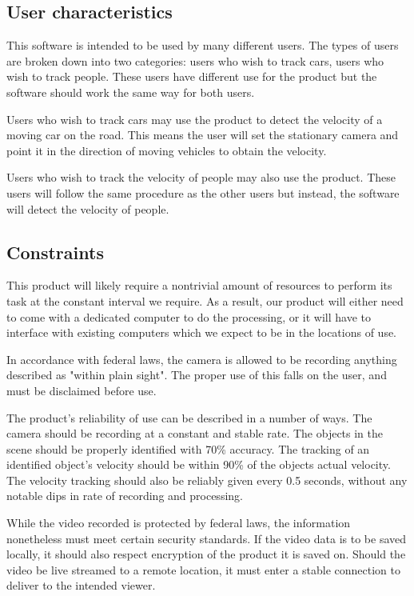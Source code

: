 \documentclass[letterpaper,10pt,onecolumn,draftclsnofoot]{IEEEtran}
\begin{document}
\subsection{User characteristics}
This software is intended to be used by many different users.
The types of users are broken down into two categories: users who wish to track cars, users who wish to track people.
These users have different use for the product but the software should work the same way for both users.

Users who wish to track cars may use the product to detect the velocity of a moving car on the road.
This means the user will set the stationary camera and point it in the direction of moving vehicles to obtain the velocity.

Users who wish to track the velocity of people may also use the product.
These users will follow the same procedure as the other users but instead, the software will detect the velocity of people.

\subsection{Constraints}
This product will likely require a nontrivial amount of resources to perform its task at the constant interval we require.
As a result, our product will either need to come with a dedicated computer to do the processing, or it will have to interface with existing computers which we expect to be in the locations of use.

In accordance with federal laws, the camera is allowed to be recording anything described as "within plain sight".
The proper use of this falls on the user, and must be disclaimed before use.

The product's reliability of use can be described in a number of ways.
The camera should be recording at a constant and stable rate.
The objects in the scene should be properly identified with 70\% accuracy.
The tracking of an identified object's velocity should be within 90\% of the objects actual velocity.
The velocity tracking should also be reliably given every 0.5 seconds, without any notable dips in rate of recording and processing.

While the video recorded is protected by federal laws, the information nonetheless must meet certain security standards.
If the video data is to be saved locally, it should also respect encryption of the product it is saved on.
Should the video be live streamed to a remote location, it must enter a stable connection to deliver to the intended viewer.
\end{document}
